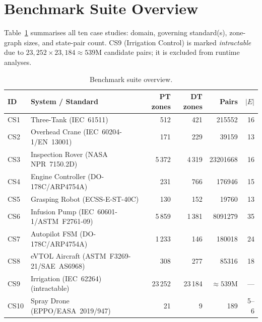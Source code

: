 \documentclass[10pt,a4paper]{article}
\newcommand{\WARN}[1]{\textcolor{warnred}{#1}}
\begin{document}
\section{Benchmark Suite Overview}

Table~\ref{tab:overview} summarises all ten case studies: domain, governing
standard(s), zone-graph sizes, and state-pair count.
CS9 (Irrigation Control) is marked \emph{intractable} due to
$23{,}252 \times 23{,}184 \approx 539\text{M}$ candidate pairs; it is
excluded from runtime analyses.

\begin{table}[htbp]
\centering
\caption{Benchmark suite overview.}
\label{tab:overview}
\small
\begin{tabular}{@{}llrrrr@{}}
\toprule
\textbf{ID} & \textbf{System / Standard} & \textbf{PT zones} & \textbf{DT zones}
            & \textbf{Pairs} & \textbf{$|E|$} \\
\midrule
CS1  & Three-Tank (IEC~61511)                     & 512     & 421     & \num{215552}    & 16 \\
CS2  & Overhead Crane (IEC~60204-1/EN~13001)      & 171     & 229     & \num{39159}     & 13 \\
CS3  & Inspection Rover (NASA NPR~7150.2D)        & 5\,372  & 4\,319  & \num{23201668}  & 16 \\
CS4  & Engine Controller (DO-178C/ARP4754A)       & 231     & 766     & \num{176946}    & 15 \\
CS5  & Grasping Robot (ECSS-E-ST-40C)             & 130     & 152     & \num{19760}     & 13 \\
CS6  & Infusion Pump (IEC~60601-1/ASTM~F2761-09)  & 5\,859  & 1\,381  & \num{8091279}   & 35 \\
CS7  & Autopilot FSM (DO-178C/ARP4754A)           & 1\,233  & 146     & \num{180018}    & 24 \\
CS8  & eVTOL Aircraft (ASTM~F3269-21/SAE~AS6968)  & 308     & 277     & \num{85316}     & 18 \\
CS9  & Irrigation (IEC~62264) \WARN{(intractable)}& 23\,252 & 23\,184 & ${\approx}539$M & --- \\
CS10 & Spray Drone (EPPO/EASA~2019/947)           & 21      & 9       & 189             & 5--6 \\
\bottomrule
\end{tabular}
\end{table}
\end{document}

